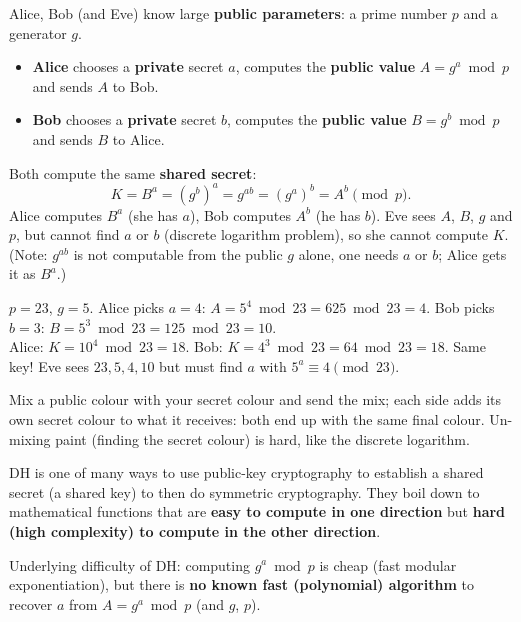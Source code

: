 \begin{defnbox}[title=Diffie-Hellman (DH) key exchange]
Alice, Bob (and Eve) know large \textbf{public parameters}: a prime number $p$ and a
generator $g$.
\begin{itemize}
  \item \textbf{Alice} chooses a \textbf{private} secret $a$, computes the
        \textbf{public value} $A = g^a \bmod p$ and sends $A$ to Bob.
  \item \textbf{Bob} chooses a \textbf{private} secret $b$, computes the
        \textbf{public value} $B = g^b \bmod p$ and sends $B$ to Alice.
\end{itemize}
Both compute the same \textbf{shared secret}:
\[
  K = B^a = (g^b)^a = g^{ab} = (g^a)^b = A^b \pmod p .
\]
Alice computes $B^a$ (she has $a$), Bob computes $A^b$ (he has $b$). Eve sees $A$, $B$,
$g$ and $p$, but cannot find $a$ or $b$ (discrete logarithm problem), so she cannot
compute $K$. (Note: $g^{ab}$ is not computable from the public $g$ alone, one needs $a$ or $b$;
Alice gets it as $B^a$.)
\end{defnbox}

\begin{exbox}[title={Toy example (real $p$ has 2048+ bits)}]
$p = 23$, $g = 5$. Alice picks $a = 4$: $A = 5^4 \bmod 23 = 625 \bmod 23 = 4$. Bob picks
$b = 3$: $B = 5^3 \bmod 23 = 125 \bmod 23 = 10$. \\
Alice: $K = 10^4 \bmod 23 = 18$. Bob: $K = 4^3 \bmod 23 = 64 \bmod 23 = 18$. Same key!
Eve sees $23, 5, 4, 10$ but must find $a$ with $5^a \equiv 4 \pmod{23}$.
\end{exbox}

\begin{rembox}[title=Paint analogy]
Mix a public colour with your secret colour and send the mix; each side adds its own
secret colour to what it receives: both end up with the same final colour. Un-mixing
paint (finding the secret colour) is hard, like the discrete logarithm.
\end{rembox}

\begin{defnbox}[title=Trapdoor functions]
DH is one of many ways to use public-key cryptography to establish a shared secret (a
shared key) to then do symmetric cryptography. They boil down to mathematical functions
that are \textbf{easy to compute in one direction} but \textbf{hard (high complexity) to
compute in the other direction}.
\end{defnbox}

\begin{defnbox}[title=Discrete Logarithm Problem (DLP)]
Underlying difficulty of DH: computing $g^a \bmod p$ is cheap (fast modular
exponentiation), but there is \textbf{no known fast (polynomial) algorithm} to recover
$a$ from $A = g^a \bmod p$ (and $g$, $p$).
\end{defnbox}

